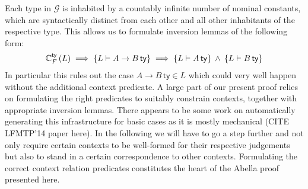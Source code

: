 \documentclass[a4paper,UKenglish]{lipics-v2016}
\newcommand{\ms}{\,}
\newcommand{\mrel}[1]{\mathrel{\ms #1 \ms}}
\newcommand{\mAnd}{\mrel{\wedge}}
\newcommand{\istyFh}[1]{\ensuremath{#1\ms\mathsf{ty}}}
\begin{document}
Each type in $\mathcal{G}$ is inhabited by a countably infinite number of nominal constants, which are syntactically distinct from each other and all other inhabitants of the respective type.
This allows us to formulate inversion lemmas of the following form:
\begin{align*}
  \acFty{L} \implies \{L \vdash \istyFh{A \to B}\} \implies \{L \vdash \istyFh{A}\} \mAnd \{L \vdash \istyFh{B}\}
\end{align*}
In particular this rules out the case $\istyFh{A \to B} \in L$ which could very well happen without the additional context predicate.
A large part of our present proof relies on formulating the right predicates to suitably constrain contexts, together with appropriate inversion lemmas.
There appears to be some work on automatically generating this infrastructure for basic cases as it is mostly mechanical (CITE LFMTP'14 paper here).
In the following we will have to go a step further and not only require certain contexts to be well-formed for their respective judgements but also to stand in a certain correspondence to other contexts.
Formulating the correct context relation predicates constitutes the heart of the Abella proof presented here.
\end{document}
